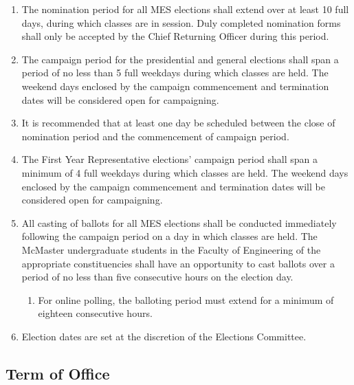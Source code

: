 \begin{enumerate}
 \item
  The nomination period for all MES elections shall extend over at least
  10 full days, during which classes are in session. Duly completed
  nomination forms shall only be accepted by the Chief Returning Officer
  during this period.
 \item
  The campaign period for the presidential and general elections shall
  span a period of no less than 5 full weekdays during which classes are
  held. The weekend days enclosed by the campaign commencement and
  termination dates will be considered open for campaigning.
 \item
  It is recommended that at least one day be scheduled between the close
  of nomination period and the commencement of campaign period.
 \item
  The First Year Representative elections' campaign period shall span a
  minimum of 4 full weekdays during which classes are held. The weekend
  days enclosed by the campaign commencement and termination dates will
  be considered open for campaigning.
 \item
  All casting of ballots for all MES elections shall be conducted
  immediately following the campaign period on a day in which classes
  are held. The McMaster undergraduate students in the Faculty of
  Engineering of the appropriate constituencies shall have an
  opportunity to cast ballots over a period of no less than five
  consecutive hours on the election day.

  \begin{enumerate}
   \item
    For online polling, the balloting period must extend for a minimum
    of eighteen consecutive hours.
  \end{enumerate}
 \item
  Election dates are set at the discretion of the Elections Committee.


\end{enumerate}
\hypertarget{term-of-office}{%
 \subsection{Term of Office}
 \label{term-of-office}}
